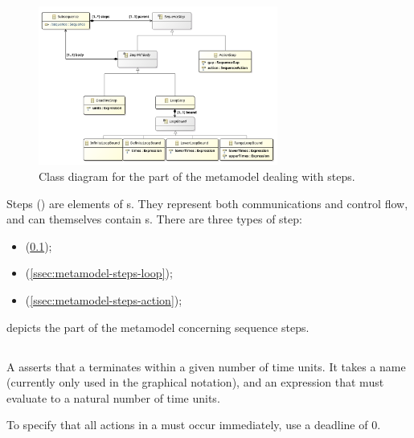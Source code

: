 \begin{figure}[htb]
	\centering
	\includegraphics[width=0.7\textwidth]{diagrams/Steps}
	\caption{Class diagram for the part of the \langname{} metamodel dealing with steps.}
	\label{fig:metamodel-steps}
\end{figure}

\noindent
Steps (\msequencestep) are elements of
\msubsequence s.  They represent both communications and control flow, and
can themselves contain \msubsequence s.  There are three types of
step:

\begin{itemize}
\item \mdeadlinestep{} (\cref{ssec:metamodel-steps-deadline});
\item \mloopstep{} (\cref{ssec:metamodel-steps-loop});
\item \mactionstep{} (\cref{ssec:metamodel-steps-action});
\end{itemize}

 depicts the part of the metamodel concerning
sequence steps.

\subsection{\mdeadlinestep}\label{ssec:metamodel-steps-deadline}

A \mdeadlinestep{} asserts that a \msubsequence{} terminates within
a given number of time units.  
It takes a name (currently only
used in the graphical notation), and an expression that must
evaluate to a natural number of time units.

\begin{remark}
To specify that all actions in a \msubsequence{} must occur
immediately, use a deadline of \(0\).
\end{remark}

